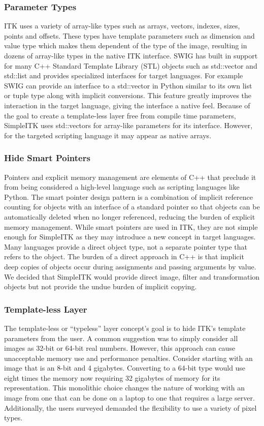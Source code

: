 \documentclass{frontiersMED} %
\begin{document}
\subsubsection{Parameter Types}
ITK uses a variety of array-like types such as arrays, vectors,
indexes, sizes, points and offsets. These types have template
parameters such as dimension and value type which makes them dependent
of the type of the image, resulting in dozens of array-like types in
the native ITK interface. SWIG has built in support for many C++
Standard Template Library (STL) objects such as std::vector and
std::list and provides specialized interfaces for target
languages. For example SWIG can provide an interface to a std::vector
in Python similar to its own list or tuple type along with implicit
conversions. This feature greatly improves the interaction in the
target language, giving the interface a native feel. Because of the
goal to create a template-less layer free from compile time
parameters, SimpleITK uses std::vectors for array-like parameters for
its interface. However, for the targeted scripting language it may
appear as native arrays.

\subsubsection{Hide Smart Pointers}
Pointers and explicit memory management are elements of C++ that
preclude it from being considered a high-level language such as
scripting languages like Python. The smart pointer design pattern is a
combination of implicit reference counting for objects with an
interface of a standard pointer so that objects can be automatically
deleted when no longer referenced, reducing the burden of explicit
memory management. While smart pointers are used in ITK, they are not
simple enough for SimpleITK as they may introduce a new concept in
target languages. Many languages provide a direct object type, not a
separate pointer type that refers to the object. The burden of a
direct approach in C++ is that implicit deep copies of objects occur
during assignments and passing arguments by value. We decided that
SimpleITK would provide direct image, filter and transformation
objects but not provide the undue burden of implicit copying.

\subsubsection{Template-less Layer}
The template-less or “typeless” layer concept’s goal is to hide ITK’s
template parameters from the user. A common suggestion was to simply
consider all images as 32-bit or 64-bit real numbers. However, this
approach can cause unacceptable memory use and performance
penalties. Consider starting with an image that is an 8-bit and 4
gigabytes.  Converting to a 64-bit type would use eight times the
memory now requiring 32 gigabytes of memory for its
representation. This monolithic choice changes the nature of working
with an image from one that can be done on a laptop to one that
requires a large server. Additionally, the users surveyed demanded the
flexibility to use a variety of pixel types.
\end{document}
